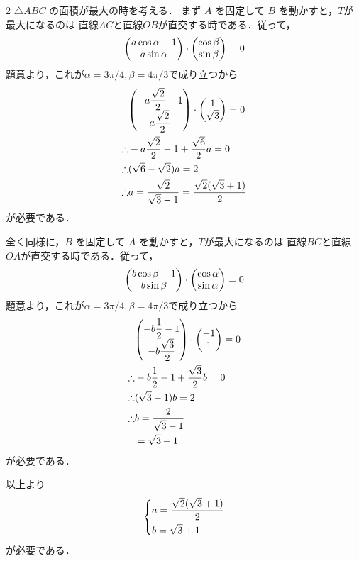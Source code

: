 \documentclass[../../main.tex]{subfiles}
\begin{document}
\begin{multicols}{2}
  $\triangle ABC$ の面積が最大の時を考える．
  まず $A$ を固定して $B$ を動かすと，$T$が最大になるのは
  直線$AC$と直線$OB$が直交する時である．従って，
  \begin{align}
    \mqty(a\cos\alpha-1 \\ a\sin\alpha) \cdot \mqty( \cos\beta \\ \sin\beta) = 0
  \end{align}
  題意より，これが$\alpha=3\pi/4, \beta=4\pi/3$で成り立つから
  \begin{align}
    & \mqty(-a\dfrac{\sqrt{2}}{2}-1 \\ a\dfrac{\sqrt{2}}{2}) \cdot \mqty( 1 \\ \sqrt{3}) = 0 \\
    \therefore & -a\dfrac{\sqrt{2}}{2}-1 + \dfrac{\sqrt{6}}{2}a = 0 \\
    \therefore & (\sqrt{6}-\sqrt{2})a = 2                         \\
    \therefore & a = \dfrac{\sqrt{2}}{\sqrt{3}-1} = \dfrac{\sqrt{2}(\sqrt{3}+1)}{2}
  \end{align}
  が必要である．

  全く同様に，$B$ を固定して $A$ を動かすと，$T$が最大になるのは
  直線$BC$と直線$OA$が直交する時である．従って，
  \begin{align}
    \mqty(b\cos\beta-1 \\ b\sin\beta) \cdot \mqty( \cos\alpha \\ \sin\alpha) = 0
  \end{align}
  題意より，これが$\alpha=3\pi/4, \beta=4\pi/3$で成り立つから
  \begin{align}
    & \mqty(-b\dfrac{1}{2}-1                     \\ -b\dfrac{\sqrt{3}}{2}) \cdot \mqty( -1 \\ 1) = 0 \\
    \therefore & -b\dfrac{1}{2}-1 + \dfrac{\sqrt{3}}{2}b = 0 \\
    \therefore & (\sqrt{3}-1)b = 2                         \\
    \therefore & b = \dfrac{2}{\sqrt{3}-1}                  \\
    & = \sqrt{3}+1
  \end{align}
  が必要である．

  以上より
  \begin{align}
    \begin{dcases}
      a =  \dfrac{\sqrt{2}(\sqrt{3}+1)}{2} \\
      b = \sqrt{3}+1
    \end{dcases}
  \end{align}
  が必要である．


\end{multicols}
\end{document}
